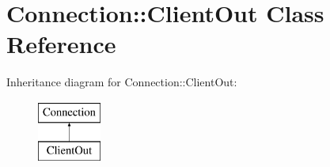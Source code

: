 \hypertarget{class_d_jabberd_1_1_connection_1_1_client_out}{
\section{\-Connection\-:\-:\-Client\-Out \-Class \-Reference}
\label{class_d_jabberd_1_1_connection_1_1_client_out}
}
\-Inheritance diagram for \-Connection\-:\-:\-Client\-Out\-:\begin{figure}[H]
\begin{center}
\leavevmode
\includegraphics[height=2.000000cm]{class_d_jabberd_1_1_connection_1_1_client_out}
\end{center}
\end{figure}
